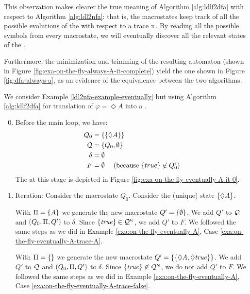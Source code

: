 \begin{example}
This observation makes clearer the true meaning of Algorithm \ref{alg:ldlf2dfa} with respect to Algorithm \ref{alg:ldl2nfa}: that is, the macrostates keep track of all the possible evolutions of the \NFA with respect to a trace $\pi$. By reading all the possible symbols from every macrostate, we will eventually discover all the relevant states of the \DFA.

Furthermore, the minimization and trimming of the resulting automaton (shown in Figure \ref{fig:exa-on-the-fly-always-A-it-complete}) yield the one shown in Figure \ref{fig:dfa-always-a}, as an evidence of the equivalence between the two algorithms.
\end{example}

\clearpage
\begin{example}
	We consider Example \ref{ldl2nfa-example-eventually} but using Algorithm \ref{alg:ldlf2dfa} for translation of $\varphi = \Diamond A$ into a \DFA.
	
	\begin{enumerate}
		\setcounter{enumi}{-1}
		\item Before the main loop, we have:
		\begin{align*}
		Q_0 &= \{\{\Diamond A\}\}\\
		\mathcal{Q}  &= \{Q_0, \emptyset\}\\
		\delta &= \emptyset\\
		F &= \emptyset \hspace*{.18in} (\text{because } \{true\}\not\in Q_0^\epsilon)
		\end{align*}
		The \DFA at this stage is depicted in Figure \ref{fig:exa-on-the-fly-eventually-A-it-0}.
		
		\item Iteration: Consider the macrostate $Q_0$. Consider the (unique) \NFA state $\{\Diamond A\}$. 
		
		With $\Pi = \{A\}$ we generate the new macrostate $Q' = \{\emptyset\}$. We add $Q'$ to $\mathcal{Q}$ and $(Q_0, \Pi, Q')$ to $\delta$. Since $\{\mathit{true}\}\in\mathcal{Q}'^\epsilon$, we add $Q'$ to $F$. We followed the same steps as we did in Example \ref{exa:on-the-fly-eventually-A}, Case \ref{exa:on-the-fly-eventually-A-trace-A}.
		
		With $\Pi = \{\}$ we generate the new macrostate $Q' =\{\{\Diamond A, \Diamond \mathit{true}\}\}$. We add $Q'$ to $\mathcal{Q}$ and $(Q_0, \Pi, Q')$ to $\delta$. Since $\{\mathit{true}\}\not\in\mathcal{Q}'^\epsilon$, we do not add $Q'$ to $F$. We followed the same steps as we did in Example \ref{exa:on-the-fly-eventually-A}, Case \ref{exa:on-the-fly-eventually-A-trace-false}.
		

\end{enumerate}
\end{example}
